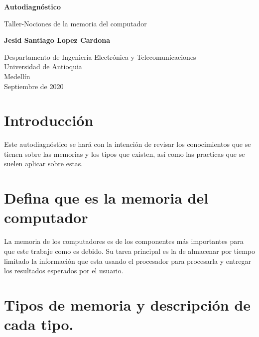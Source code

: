 \documentclass{article}
\begin{document}
\begin{titlepage}
    \begin{center}
        \vspace*{1cm}
            
        \Huge
        \textbf{Autodiagnóstico}
            
        \vspace{0.5cm}
        \LARGE
        Taller-Nociones de la memoria del computador
            
        \vspace{1.5cm}
            
        \textbf{Jesid Santiago Lopez Cardona}
            
        \vfill
            
        \vspace{0.8cm}
            
        \Large
        Despartamento de Ingeniería Electrónica y Telecomunicaciones\\
        Universidad de Antioquia\\
        Medellín\\
        Septiembre de 2020
            
    \end{center}
\end{titlepage}

\tableofcontents
\section{Introducción}Este autodiagnóstico se hará con la intención de revisar los conocimientos que se tienen sobre las memorias y los tipos que existen, así como las practicas que se suelen aplicar sobre estas.

\section{Defina que es la memoria del computador}La memoria de los computadores es de los componentes más importantes para que este trabaje como es debido. Su tarea principal es la de almacenar por tiempo limitado la información que esta usando el procesador para procesarla y entregar los resultados esperados por el usuario.

\section{Tipos de memoria y descripción de cada tipo.} \label{contenido}
\end{document}
